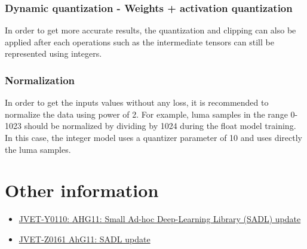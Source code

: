\documentclass[10pt,a4paper]{article}
\begin{document}
\subsubsection{Dynamic quantization - Weights + activation quantization}
In order to get more accurate results, the quantization and clipping can also be applied after each operations such as the intermediate tensors can still be represented using integers.

\subsubsection{Normalization}
In order to get the inputs values without any loss, it is recommended to normalize the data using power of 2. For example, luma samples in the range 0-1023 should be normalized by dividing by 1024 during the float model training. In this case, the integer model uses a quantizer parameter of 10 and uses directly the luma samples.


\section{Other information}
\begin{itemize}
\item \href{https://jvet-experts.org/doc_end_user/documents/25_Teleconference/wg11/JVET-Y0110-v3.zip}{JVET-Y0110: AHG11: Small Ad-hoc Deep-Learning Library (SADL) update}
\item \href{https://jvet-experts.org/doc_end_user/documents/26_Teleconference/wg11/JVET-Z0161-v3.zip}{JVET-Z0161 AhG11: SADL update}


\end{itemize}
\end{document}
